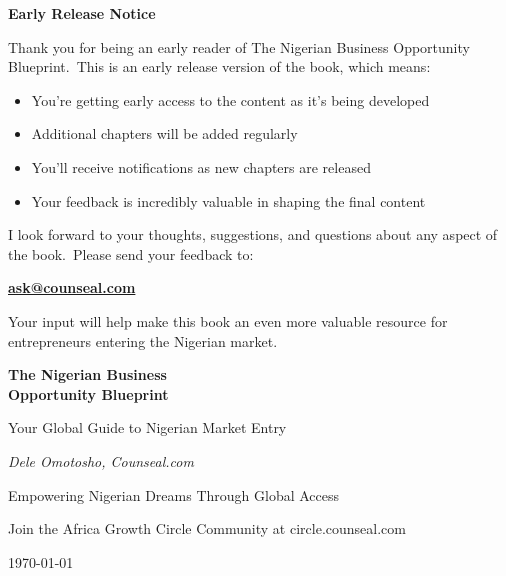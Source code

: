 \documentclass[11pt,letterpaper,openany]{book}
\newcommand{\currentdate}{\today}
\begin{document}
    \frontmatter
    \newpage
    \thispagestyle{empty}
    \begin{center}
        \Large\bfseries\color{primarydark}
        Early Release Notice
    \end{center}
    \vspace{1cm}

    \begin{tcolorbox}[colback=primarylight,colframe=primarydark]
        Thank you for being an early reader of The Nigerian Business Opportunity Blueprint.\ This is an early release version of the book, which means:

        \begin{itemize}
            \item You're getting early access to the content as it's being developed
            \item Additional chapters will be added regularly
            \item You'll receive notifications as new chapters are released
            \item Your feedback is incredibly valuable in shaping the final content
        \end{itemize}

        I look forward to your thoughts, suggestions, and questions about any aspect of the book.\ Please send your feedback to:

        \begin{center}
            \large\textbf{\href{mailto:ask@counseal.com}{ask@counseal.com}}
        \end{center}

        Your input will help make this book an even more valuable resource for entrepreneurs entering the Nigerian market.
    \end{tcolorbox}
    
    \begin{titlepage}
        \centering
        \vspace*{2cm}
        {\Huge\bfseries\color{primarydark} The Nigerian Business\\Opportunity Blueprint\par}
        \vspace{1cm}
        {\Large\color{primary} Your Global Guide to Nigerian Market Entry\par}
        \vspace{2cm}
        {\Large\itshape Dele Omotosho, Counseal.com\par}
        \vspace{1cm}
        {\large Empowering Nigerian Dreams Through Global Access\par}
        \vfill
        {\large Join the Africa Growth Circle Community at circle.counseal.com\par}
        \vspace{1cm}
        {\large \currentdate\par}
    \end{titlepage}
\end{document}

